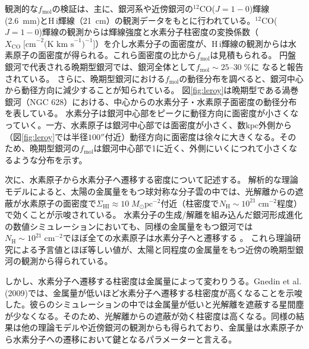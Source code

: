 観測的な$f_{\text{mol}}$の検証は、主に、銀河系や近傍銀河の$^{12}$CO($J=1-0$)輝線(2.6~mm)とH\,{\sc i}輝線（21~cm）の観測データをもとに行われている。$^{12}$CO($J=1-0$)輝線の観測からは輝線強度と水素分子柱密度の変換係数（$X_{\text{CO}} \;\mbox{[cm}^{-2} \mbox{(K km s}^{-1})^{-1}]$）を介し水素分子の面密度が、H\,{\sc i}輝線の観測からは水素原子の面密度が得られる。これら面密度の比から$f_{\text{mol}}$は見積もられる。
円盤銀河で代表される晩期型銀河では、銀河全体として$f_{\text{mol}}\sim 25 \mbox{--} 30\; \%$に
なると報告されている\citep{2014A&A...564..66B}。
さらに、晩期型銀河における$f_{\text{mol}}$の動径分布を調べると、銀河中心から動径方向に減少することが知られている\citep[e.g.,][]{2012ApJ...756..183B, 2014PASJ...66...66T}。
図\ref{fig:leroy}は晩期型である渦巻銀河（NGC 628）における、中心からの水素分子・水素原子面密度の動径分布を表している。
水素分子は銀河中心部をピークに動径方向に面密度が小さくなっていく。一方、水素原子は銀河中心部では面密度が小さく、数kpc外側から（図\ref{fig:leroy}では半径$100''$付近）動径方向に面密度は徐々に大きくなる。そのため、晩期型銀河の$f_{\text{mol}}$は銀河中心部で1に近く、外側にいくにつれて小さくなるような分布を示す。

次に、水素原子から水素分子へ遷移する密度について記述する。
解析的な理論モデルによると、太陽の金属量をもつ球対称な分子雲の中では、光解離からの遮蔽が水素原子の面密度で$\Sigma_{\text{HI}} \approx 10\; M_\odot \mbox{pc}^{-2}$付近（柱密度で$N_{\text{H}}\sim 10^{21}\;
\mbox{cm}^{-2}$程度）で効くことが示唆されている\citep{2009ApJ...693..216K}。
水素分子の生成/解離を組み込んだ銀河形成進化の数値シミュレーションにおいても、同様の金属量をもつ銀河では$N_{\text{H}}\sim 10^{21} \; \mbox{cm}^{-2}$でほぼ全ての水素原子は水素分子へと遷移する
\citep[e.g.,][]{2006ApJ...645.1024P, 2009ApJ...697...55G}。
これら理論研究による予言値とほぼ等しい値が、太陽と同程度の金属量をもつ近傍の晩期型銀河の観測から得られている\citep[e.g.,][]{2002ApJ...569..157W, 2008AJ....136.2846B}。

しかし、水素分子へ遷移する柱密度は金属量によって変わりうる。Gnedin et al. (2009)では、金属量が低いほど水素分子へ遷移する柱密度が高くなることを示唆した。彼らのシミュレーションの中では金属量が低いと光解離を遮蔽する星間塵が少なくなる。そのため、光解離からの遮蔽が効く柱密度は高くなる。同様の結果は他の理論モデルや近傍銀河の観測からも得られており\citep[e.g.,][]{2009ApJ...693..216K, 2010ApJ...709..308M, 2010ApJ...722..919F, 2013ApJ...777L...4W, 
2014MNRAS.442.2780R}、金属量は水素原子から水素分子への遷移において鍵となるパラメーターと言える。

